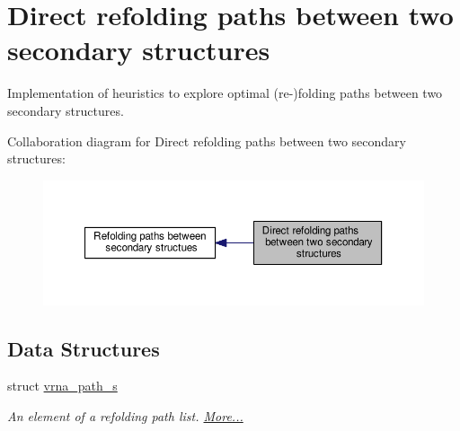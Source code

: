 \hypertarget{group__direct__paths}{\section{Direct refolding paths between two secondary structures}
\label{group__direct__paths}
}


Implementation of heuristics to explore optimal (re-\/)folding paths between two secondary structures.  


Collaboration diagram for Direct refolding paths between two secondary structures\-:
\nopagebreak
\begin{figure}[H]
\begin{center}
\leavevmode
\includegraphics[width=350pt]{group__direct__paths}
\end{center}
\end{figure}
\subsection*{Data Structures}
\begin{DoxyCompactItemize}
\item 
struct \hyperlink{group__direct__paths_structvrna__path__s}{vrna\-\_\-path\-\_\-s}
\begin{DoxyCompactList}\small\item\em An element of a refolding path list.  \hyperlink{group__direct__paths_structvrna__path__s}{More...}\end{DoxyCompactList}\end{DoxyCompactItemize}
